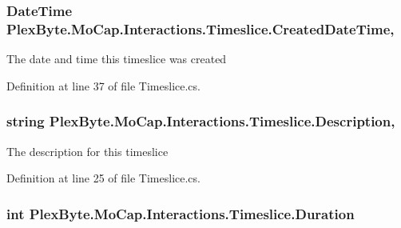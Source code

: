 \subsubsection[{\texorpdfstring{Created\+Date\+Time}{CreatedDateTime}}]{\setlength{\rightskip}{0pt plus 5cm}Date\+Time Plex\+Byte.\+Mo\+Cap.\+Interactions.\+Timeslice.\+Created\+Date\+Time\hspace{0.3cm}{\ttfamily [get]}, {\ttfamily [set]}}\hypertarget{class_plex_byte_1_1_mo_cap_1_1_interactions_1_1_timeslice_a89403bba6198efa97b362901d8717222}{}\label{class_plex_byte_1_1_mo_cap_1_1_interactions_1_1_timeslice_a89403bba6198efa97b362901d8717222}


The date and time this timeslice was created 



Definition at line 37 of file Timeslice.\+cs.

\subsubsection[{\texorpdfstring{Description}{Description}}]{\setlength{\rightskip}{0pt plus 5cm}string Plex\+Byte.\+Mo\+Cap.\+Interactions.\+Timeslice.\+Description\hspace{0.3cm}{\ttfamily [get]}, {\ttfamily [set]}}\hypertarget{class_plex_byte_1_1_mo_cap_1_1_interactions_1_1_timeslice_a27e3e7780a2a7fcb05d20418785d16a5}{}\label{class_plex_byte_1_1_mo_cap_1_1_interactions_1_1_timeslice_a27e3e7780a2a7fcb05d20418785d16a5}


The description for this timeslice 



Definition at line 25 of file Timeslice.\+cs.

\subsubsection[{\texorpdfstring{Duration}{Duration}}]{\setlength{\rightskip}{0pt plus 5cm}int Plex\+Byte.\+Mo\+Cap.\+Interactions.\+Timeslice.\+Duration\hspace{0.3cm}{\ttfamily [get]}}\hypertarget{class_plex_byte_1_1_mo_cap_1_1_interactions_1_1_timeslice_ad5f08401972f9e23eb9afb0ff1ccfbd6}{}\label{class_plex_byte_1_1_mo_cap_1_1_interactions_1_1_timeslice_ad5f08401972f9e23eb9afb0ff1ccfbd6}


